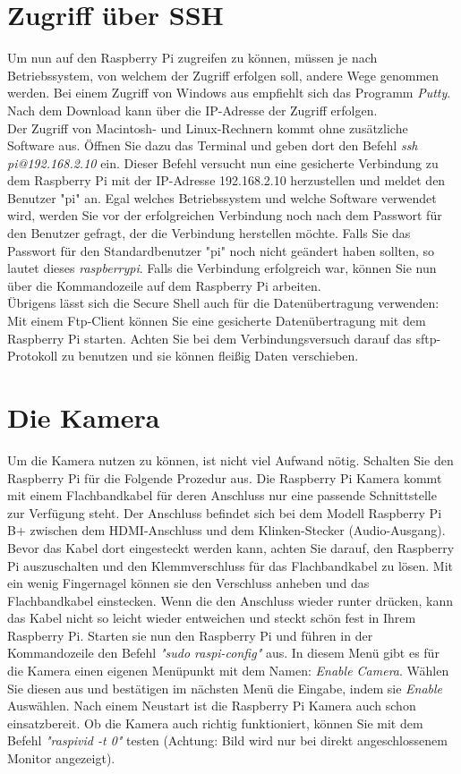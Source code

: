 \documentclass[12pt,a4paper]{scrreprt}
\begin{document}
\section{Zugriff über SSH}
Um nun auf den Raspberry Pi zugreifen zu können, müssen je nach Betriebssystem, von welchem der Zugriff erfolgen soll, andere Wege genommen werden. Bei einem Zugriff von Windows aus empfiehlt sich das Programm \textit{Putty}. Nach dem Download kann über die IP-Adresse der Zugriff erfolgen. \\Der Zugriff von Macintosh- und Linux-Rechnern kommt ohne zusätzliche Software aus. Öffnen Sie dazu das Terminal und geben dort den Befehl \textit{ssh pi@192.168.2.10} ein. Dieser Befehl versucht nun eine gesicherte Verbindung zu dem Raspberry Pi mit der IP-Adresse 192.168.2.10 herzustellen und meldet den Benutzer "pi" an. Egal welches Betriebssystem und welche Software verwendet wird, werden Sie vor der erfolgreichen Verbindung noch nach dem Passwort für den Benutzer gefragt, der die Verbindung herstellen möchte. Falls Sie das Passwort für den Standardbenutzer "pi" noch nicht geändert haben sollten, so lautet dieses \textit{raspberrypi}. Falls die Verbindung erfolgreich war, können Sie nun über die Kommandozeile auf dem Raspberry Pi arbeiten. \\ Übrigens lässt sich die Secure Shell auch für die Datenübertragung verwenden: Mit einem Ftp-Client können Sie eine gesicherte Datenübertragung mit dem Raspberry Pi starten. Achten Sie bei dem Verbindungsversuch darauf das sftp-Protokoll zu benutzen und sie können fleißig Daten verschieben.

\section{Die Kamera}
Um die Kamera nutzen zu können, ist nicht viel Aufwand nötig. Schalten Sie den Raspberry Pi für die Folgende Prozedur aus. Die Raspberry Pi Kamera kommt mit einem Flachbandkabel für deren Anschluss nur eine passende Schnittstelle zur Verfügung steht. Der Anschluss befindet sich bei dem Modell Raspberry Pi B+ zwischen dem HDMI-Anschluss und dem Klinken-Stecker (Audio-Ausgang). Bevor das Kabel dort eingesteckt werden kann, achten Sie darauf, den Raspberry Pi auszuschalten und den Klemmverschluss für das Flachbandkabel zu lösen. Mit ein wenig Fingernagel können sie den Verschluss anheben und das Flachbandkabel einstecken. Wenn die den Anschluss wieder runter drücken, kann das Kabel nicht so leicht wieder entweichen und steckt schön fest in Ihrem Raspberry Pi. Starten sie nun den Raspberry Pi und führen in der Kommandozeile den Befehl \textit{"sudo raspi-config"} aus. In diesem Menü gibt es für die Kamera einen eigenen Menüpunkt mit dem Namen: \textit{Enable Camera}. Wählen Sie diesen aus und bestätigen im nächsten Menü die Eingabe, indem sie \textit{Enable} Auswählen. Nach einem Neustart ist die Raspberry Pi Kamera auch schon einsatzbereit. Ob die Kamera auch richtig funktioniert, können Sie mit dem Befehl \textit{"raspivid -t 0"} testen (Achtung: Bild wird nur bei direkt angeschlossenem Monitor angezeigt). 
\end{document}
